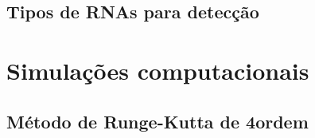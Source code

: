 \subsection{Tipos de RNAs para detecção}

\section{Simulações computacionais}

\subsection{Método de Runge-Kutta de 4\textordfeminine ordem}
